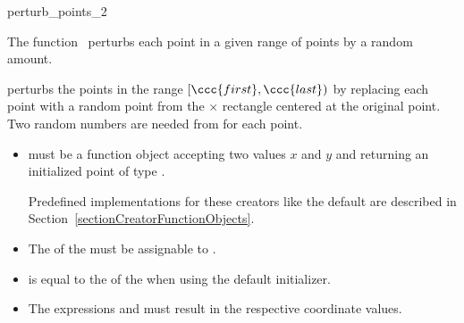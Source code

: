 \begin{ccRefFunction}{perturb_points_2}

\ccDefinition

The function \ccRefName\ perturbs each point in a given range of points by
a random amount. 


\def\ccLongParamLayout{\ccTrue}
{ perturbs the points in the range $[\ccc{first},\ccc{last})$ by
  replacing each point with a random point from the 
   $\times$  rectangle centered at the original point.
  Two random numbers are needed from  for each point.
}

\ccRequirements
\begin{itemize}
   \item {} must be a function object accepting two
          values $x$ and $y$ and returning an initialized point
          of type . 

         Predefined implementations for these creators like the default are
         described in Section~\ref{sectionCreatorFunctionObjects}. 

  \item The  of the  must be assignable 
        to .
  \item {} is equal to the  of the
         when using the default initializer.
  \item The expressions  and
         must result in the respective
        coordinate values.
\end{itemize}

\ccSeeAlso
{} \\
 \\
 \\
 \\
 \\




\end{ccRefFunction}
